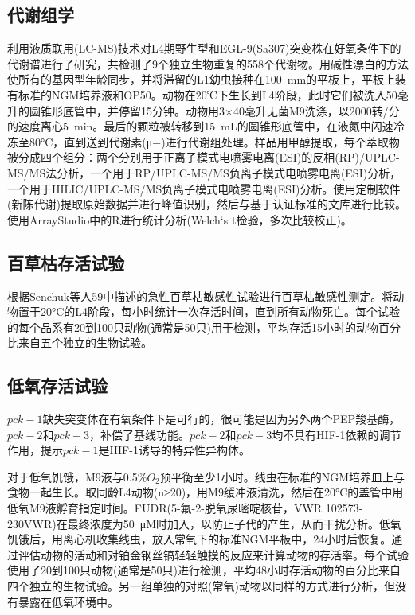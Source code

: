 \documentclass{ctexart}
\begin{document}
        \subsection{代谢组学}

        利用液质联用(LC-MS)技术对L4期野生型和EGL-9(Sa307)突变株在好氧条件下的代谢谱进行了研究，共检测了9个独立生物重复的558个代谢物。用碱性漂白的方法使所有的基因型年龄同步，并将滞留的L1幼虫接种在100~mm的平板上，平板上装有标准的NGM培养液和OP50。动物在20℃下生长到L4阶段，此时它们被洗入50毫升的圆锥形底管中，并停留15分钟。动物用3×40毫升无菌M9洗涤，以2000转/分的速度离心5~min。最后的颗粒被转移到15~mL的圆锥形底管中，在液氮中闪速冷冻至80°C，直到送到代谢素(μ−)进行代谢组处理。样品用甲醇提取，每个萃取物被分成四个组分：两个分别用于正离子模式电喷雾电离(ESI)的反相(RP)/UPLC-MS/MS法分析，一个用于RP/UPLC-MS/MS负离子模式电喷雾电离(ESI)分析，一个用于HILIC/UPLC-MS/MS负离子模式电喷雾电离(ESI)分析。使用定制软件(新陈代谢)提取原始数据并进行峰值识别，然后与基于认证标准的文库进行比较。使用ArrayStudio中的R进行统计分析(Welch‘s t检验，多次比较校正)。

        \subsection{百草枯存活试验}
        
        根据Senchuk等人59中描述的急性百草枯敏感性试验进行百草枯敏感性测定。将动物置于20°C的L4阶段，每小时统计一次存活时间，直到所有动物死亡。每个试验的每个品系有20到100只动物(通常是50只)用于检测，平均存活15小时的动物百分比来自五个独立的生物试验。

        \subsection{低氧存活试验}

        $pck-1$缺失突变体在有氧条件下是可行的，很可能是因为另外两个PEP羧基酶，$pck-2$和$pck-3$，补偿了基线功能。$pck-2$和$pck-3$均不具有HIF-1依赖的调节作用，提示$pck-1$是HIF-1诱导的特异性异构体。

        对于低氧饥饿，M9液与0.5\%$O_2$预平衡至少1小时。线虫在标准的NGM培养皿上与食物一起生长。取同龄L4动物(n≥20)，用M9缓冲液清洗，然后在20°C的盖管中用低氧M9液孵育指定时间。FUDR(5-氟-2-脱氧尿嘧啶核苷，VWR 102573-230VWR)在最终浓度为50~μM时加入，以防止子代的产生，从而干扰分析。低氧饥饿后，用离心机收集线虫，放入常氧下的标准NGM平板中，24小时后恢复。通过评估动物的活动和对铂金钢丝镐轻轻触摸的反应来计算动物的存活率。每个试验使用了20到100只动物(通常是50只)进行检测，平均48小时存活动物的百分比来自四个独立的生物试验。另一组单独的对照(常氧)动物以同样的方式进行分析，但没有暴露在低氧环境中。
\end{document}
